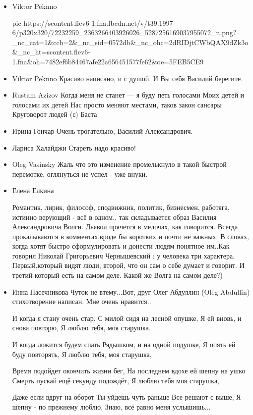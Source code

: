 \begin{itemize}

\item Viktor Peknno

\ifcmt
pic https://scontent.fiev6-1.fna.fbcdn.net/v/t39.1997-6/p320x320/72232259_2363266403926026_5287256169037955072_n.png?_nc_cat=1&ccb=2&_nc_sid=0572db&_nc_ohc=2dRIDjtCWbQAX9dZk3o&_nc_ht=scontent.fiev6-1.fna&oh=7482ef6b84467afe22a656451577fe62&oe=5FEB5CE9
\fi

\item Viktor Peknno
Красиво написано, и с душой. И Вы себя Василий берегите.

\item Rustam Azizov
Когда меня не станет — я буду петь голосами
Моих детей и голосами их детей
Нас просто меняют местами, таков закон сансары
Круговорот людей (с) Баста

\item Ирина Гончар
Очень трогательно, Василий Александрович.

\item Лариса Халайджи
Стареть надо красиво!

\item Oleg Vasinsky
Жаль что это изменение промелькнуло в такой быстрой перемотке, оглянуться не успел - уже внуки.

\item Елена Елкина

Романтик, лирик, философ, сподвижник, политик, бизнесмен, работяга, истинно
верующий - всё в одном.. так складывается образ Василия Александровича Волги.
Дьявол прячется в мелочах, как говорится. Всегда прокалываются в
комментах,вроде бы коротких и почти не важных. В словах, когда хотят быстро
сформулировать и донести людям понятное им..Как говорил Николай Григорьевич
Чернышевский : у человека три характера. Первый,который видят люди, второй, что
он сам о себе думает и говорит. И третий-который есть на самом деле. Какой же
Волга на самом деле?)

\item Инна Пасечникова
Чуток не втему...Вот, друг Олег Абдуллин (Oleg Abdullin)
стихотворение написан. Мне очень нравится..

\begin{multicols}{2}
	\obeycr
И когда я стану очень стар,
С милой сидя на лесной опушке,
Я ей вновь, и снова повторю,
Я люблю тебя, моя старушка.

И когда ложится будем спать
Рядышком, и на одной подушке,
Я опять ей буду повторять,
Я люблю тебя, моя старушка,

Время подойдет окончить жизни бег,
На последнем вдохе ей шепну на ушко
Смерть пускай ещё секунду подождёт,
Я люблю тебя моя старушка,

Даже если вдруг на оборот
Ты уйдешь чуть раньше
Все решают с выше,
Я шепну - по прежнему люблю,
Знаю, всё равно меня услышишь... 
	\restorecr
\end{multicols}

\end{itemize}
